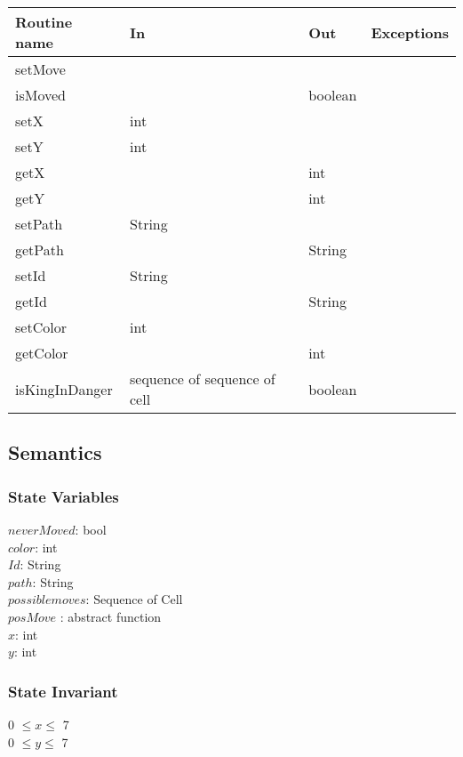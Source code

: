 \documentclass[12pt]{article}
\begin{document}
\begin{tabular}{| l | l | l | l |}
\hline
\textbf{Routine name} & \textbf{In} & \textbf{Out} & \textbf{Exceptions}\\
\hline
setMove & ~ & ~ & ~\\
\hline
isMoved & ~ & boolean & ~\\
\hline
setX & int & ~ & ~\\
\hline
setY & int & ~ & ~\\
\hline
getX & ~ & int & ~\\
\hline
getY & ~ & int & ~\\
\hline
setPath & String & ~ & ~\\
\hline
getPath & ~  & String & ~\\
\hline
setId & String & ~ & ~\\
\hline
getId & ~ & String & ~\\
\hline
setColor & int & ~ & ~\\
\hline
getColor & ~ & int & ~\\
\hline
isKingInDanger & sequence of sequence of cell & boolean &  ~\\
\hline
\end{tabular}

\subsection* {Semantics}

\subsubsection* {State Variables}

$neverMoved$: bool\\
$color$: int \\
$Id$: String \\
$path$: String\\
$possiblemoves$: Sequence of Cell \\
$posMove$ : abstract function\\
$x$: int\\
$y$: int\\

\subsubsection* {State Invariant}

0 $\leq x \leq$ 7\\
0 $\leq y \leq$ 7 
\end{document}
